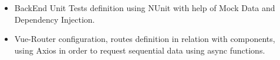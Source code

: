 \documentclass[letterpaper]{twentysecondcv} %
\begin{document}
\begin{twenty}
{\begin{itemize}
\begin{itemize}
                    \item BackEnd Unit Tests definition using NUnit with help of Mock Data and Dependency Injection.
                    
                    \item Vue-Router configuration, routes definition in relation with components, using Axios in order to request sequential data using async functions. %
                    

                    
                    

                \end{itemize}
            \end{itemize}
        }
        
    \end{twenty}

\newpage
\sidebar
\end{document}
